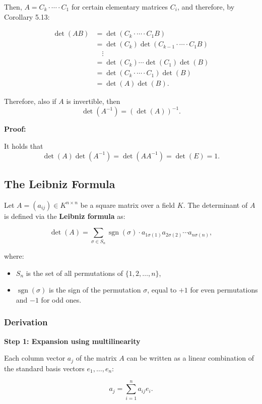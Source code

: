 Then, \( A = C_k \cdot \cdots \cdot C_1 \) for certain elementary matrices \( C_i \), and therefore, by Corollary 5.13:

\begin{align*}
\det(AB) &= \det(C_k \cdot \cdots \cdot C_1 B) \\
&= \det(C_k)\det(C_{k-1} \cdot \cdots \cdot C_1 B) \\
&\quad \vdots \\
&= \det(C_k) \cdots \det(C_1)\det(B) \\
&= \det(C_k \cdot \cdots \cdot C_1)\det(B) \\
&= \det(A)\det(B).
\end{align*}

Therefore, also if \(A\) is invertible, then
\[
\det(A^{-1}) = {(\det(A))}^{-1}.
\]

\textbf{Proof:} 

It holds that
\[
\det(A)\det(A^{-1}) = \det(AA^{-1}) = \det(E) = 1.
\]

\subsection{The Leibniz Formula}

Let \( A = (a_{ij}) \in K^{n \times n} \) be a square matrix over a field \( K \). The determinant of \(A\) is defined via the \textbf{Leibniz formula} as:

\[
\det(A) = \sum_{\sigma \in S_n} \operatorname{sgn}(\sigma) \cdot a_{1\sigma(1)} a_{2\sigma(2)} \cdots a_{n\sigma(n)},
\]

where:
\begin{itemize}
    \item \( S_n \) is the set of all permutations of \( \{1, 2, \dots, n\} \),
    \item \( \operatorname{sgn}(\sigma) \) is the sign of the permutation \( \sigma \), equal to \( +1 \) for even permutations and \( -1 \) for odd ones.
\end{itemize}

\subsubsection{Derivation}

\textbf{Step 1: Expansion using multilinearity}

Each column vector \( a_j \) of the matrix \(A\) can be written as a linear combination of the standard basis vectors \( e_1, \dots, e_n \):

\[
a_j = \sum_{i=1}^n a_{ij} e_i.
\]

